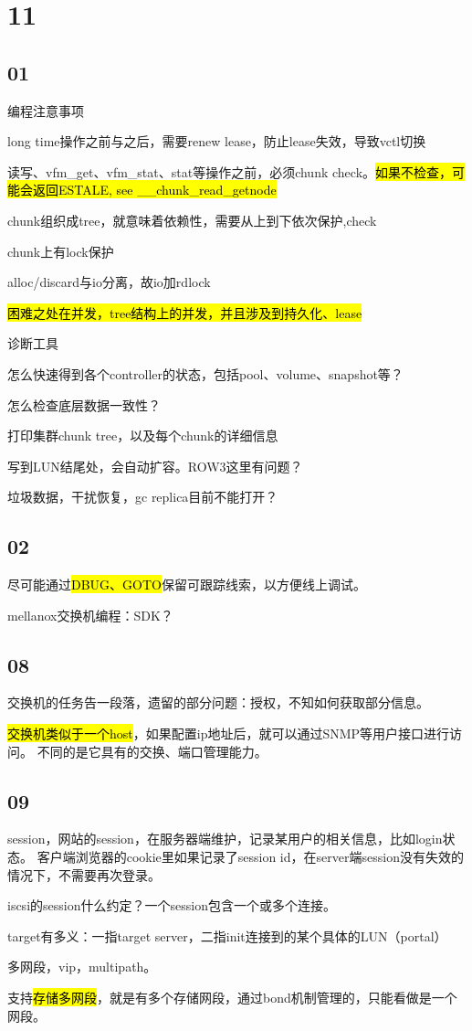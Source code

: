 \section{11}

\subsection{01}

编程注意事项
\begin{enumbox}
\item long time操作之前与之后，需要renew lease，防止lease失效，导致vctl切换
\item 读写、vfm\_get、vfm\_stat、stat等操作之前，必须chunk check。\hl{如果不检查，可能会返回ESTALE, see \_\_chunk\_read\_getnode}
\item chunk组织成tree，就意味着依赖性，需要从上到下依次保护,check
\item chunk上有lock保护
\item alloc/discard与io分离，故io加rdlock
\item \hl{困难之处在并发，tree结构上的并发，并且涉及到持久化、lease}
\end{enumbox}

诊断工具
\begin{enumbox}
\item 怎么快速得到各个controller的状态，包括pool、volume、snapshot等？
\item 怎么检查底层数据一致性？
\item 打印集群chunk tree，以及每个chunk的详细信息
\end{enumbox}

写到LUN结尾处，会自动扩容。ROW3这里有问题？

垃圾数据，干扰恢复，gc replica目前不能打开？

\subsection{02}

尽可能通过\hl{DBUG、GOTO}保留可跟踪线索，以方便线上调试。

mellanox交换机编程：SDK？

\subsection{08}

交换机的任务告一段落，遗留的部分问题：授权，不知如何获取部分信息。

\hl{交换机类似于一个host}，如果配置ip地址后，就可以通过SNMP等用户接口进行访问。
不同的是它具有的交换、端口管理能力。

\subsection{09}

session，网站的session，在服务器端维护，记录某用户的相关信息，比如login状态。
客户端浏览器的cookie里如果记录了session id，在server端session没有失效的情况下，不需要再次登录。

iscsi的session什么约定？一个session包含一个或多个连接。

target有多义：一指target server，二指init连接到的某个具体的LUN（portal）

多网段，vip，multipath。

支持\hl{存储多网段}，就是有多个存储网段，通过bond机制管理的，只能看做是一个网段。
